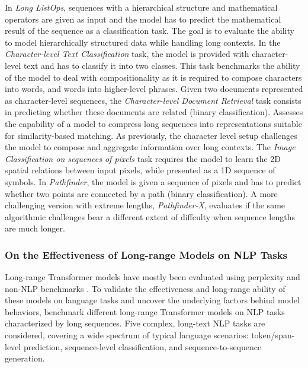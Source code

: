 
In \textit{Long ListOps}, sequences with a hierarchical structure and mathematical operators are given as input and the model has to predict the mathematical result of the sequence as a classification task. The goal is to evaluate the ability to model hierarchically structured data while handling long contexts. 
In the \textit{Character-level Text Classification} task, the model is provided with character-level text and has to classify it into two classes. This task benchmarks the ability of the model to deal with compositionality as it is required to compose characters into words, and words into higher-level phrases.
Given two documents represented as character-level sequences, the \textit{Character-level Document Retrieval} task consists in predicting whether these documents are related (binary classification). Assesses the capability of a model to compress long sequences into representations suitable for similarity-based matching. As previously, the character level setup challenges the model to compose and aggregate information over long contexts.
The \textit{Image Classification on sequences of pixels} task requires the model to learn the 2D spatial relations between input pixels, while presented as a 1D sequence of symbols.
In \textit{Pathfinder}, the model is given a sequence of pixels and has to predict whether two points are connected by a path (binary classification). A more challenging version with extreme lengths, \textit{Pathfinder-X}, evaluates if the same algorithmic challenges bear a different extent of diffculty when sequence lengths are much longer.

\subsubsection{On the Effectiveness of Long-range Models on NLP Tasks}

Long-range Transformer models have mostly been evaluated using perplexity \citep{dai2019transformer} and non-NLP benchmarks \citep{tay2020long}. To validate the effectiveness and long-range ability of these models on language tasks and uncover the underlying factors behind model behaviors, \citet{qin2022nlp} benchmark different long-range Transformer models on \ac{NLP} tasks characterized by long sequences. Five complex, long-text \ac{NLP} tasks are considered, covering a wide spectrum of typical language scenarios: token/span-level prediction, sequence-level classification, and sequence-to-sequence generation.

